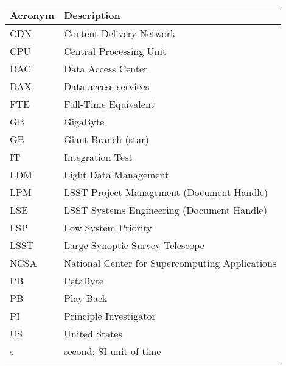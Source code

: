 \addtocounter{table}{-1}
\begin{longtable}{|l|p{}|}\hline
\textbf{Acronym} & \textbf{Description}  \\\hline

CDN & Content Delivery Network \\\hline
CPU & Central Processing Unit \\\hline
DAC & Data Access Center \\\hline
DAX & Data access services \\\hline
FTE & Full-Time Equivalent \\\hline
GB & GigaByte \\\hline
GB & Giant Branch (star) \\\hline
IT & Integration Test \\\hline
LDM & Light Data Management \\\hline
LPM & LSST Project Management (Document Handle) \\\hline
LSE & LSST Systems Engineering (Document Handle) \\\hline
LSP & Low System Priority \\\hline
LSST & Large Synoptic Survey Telescope \\\hline
NCSA & National Center for Supercomputing Applications \\\hline
PB & PetaByte \\\hline
PB & Play-Back \\\hline
PI & Principle Investigator \\\hline
US & United States \\\hline
s & second; SI unit of time \\\hline
\end{longtable}
